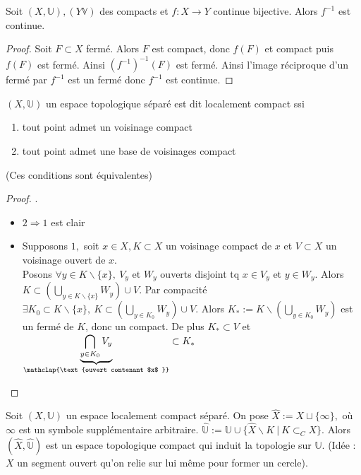 \begin{corollaire}
    Soit $(X,\mathbb{U}),(Y\mathbb{V})$ des compacts et $f:X\to Y$ continue bijective. Alors $f^{-1} $ est continue.
\end{corollaire}
\begin{proof}
    Soit $F\subset X$ fermé. Alors $F$ est compact, donc $f(F)$ et compact puis $f(F)$ est fermé. Ainsi $\left( f^{-1}  \right) ^{-1} (F)$ est fermé. Ainsi l'image réciproque d'un fermé par $f^{-1} $ est un fermé donc $f^{-1} $ est continue.
\end{proof}
\begin{definition}
    $(X,\mathbb{U})$ un espace topologique séparé est dit localement compact ssi
   \begin{enumerate}
       \item tout point admet un voisinage compact
        \item tout point admet une base de voisinages compact
   \end{enumerate}
   (Ces conditions sont équivalentes)
\end{definition}
\begin{proof}.
    \begin{itemize}
        \item $2\Rightarrow 1$ est clair
        \item Supposons $1,$ soit $x\in X,K\subset X$ un voisinage compact de $x$ et $V\subset X$ un voisinage ouvert de $x.$ \\
            Posons $\forall y\in K\backslash \{x\} ,\ V_y $ et $W_y$ ouverts disjoint tq $x\in V_y$ et $y\in W_y.$ Alors $K\subset \left( \bigcup\limits_{y\in K\backslash \{x\} }W_y  \right)\cup V $. Par compacité $\exists K_0\subset K\backslash \{x\} ,\ K\subset \left( \bigcup\limits_{y\in K_0} W_y \right) \cup V.$ Alors $K_*:=K\backslash \left( \bigcup\limits_{y\in K_0} W_y \right) $ est un fermé de $K$, donc un compact. De plus $K_*\subset V$ et $\underbrace{\bigcap\limits_{y\in K_0} V_y}_{\mathclap{\text{ouvert contenant $x$ }}}\subset K_*$
    \end{itemize}
\end{proof}
\begin{definition}
    Soit $(X,\mathbb{U})$ un espace localement compact séparé. On pose $\hat{X}:=X\sqcup \{\infty \} ,$ où $\infty $ est un symbole supplémentaire arbitraire. $\hat{\mathbb{U}}:=\mathbb{U}\cup \{\hat{X}\backslash K\ |\ K\subset _CX\}  $. Alors $(\hat{X},\hat{\mathbb{U}})$ est un espace topologique compact qui induit la topologie sur $\mathbb{U}.$ (Idée : $X$ un segment ouvert qu'on relie sur lui même pour former un cercle).
\end{definition}

